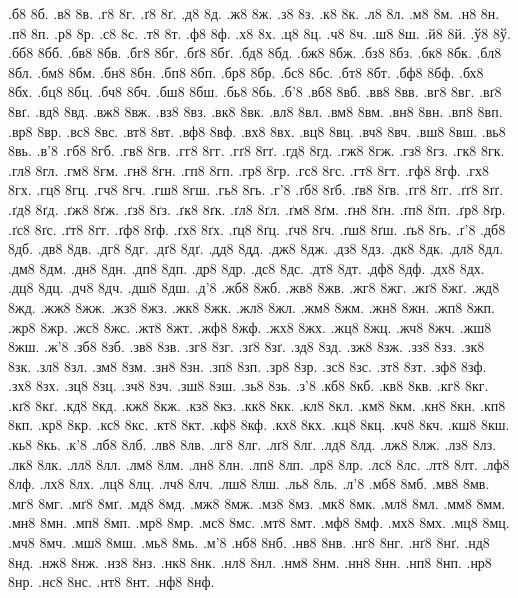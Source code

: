 {%
%
.б8 8б.
.в8 8в.
.г8 8г.
.ґ8 8ґ.
.д8 8д.
.ж8 8ж.
.з8 8з.
.к8 8к.
.л8 8л.
.м8 8м.
.н8 8н.
.п8 8п.
.р8 8р.
.с8 8с.
.т8 8т.
.ф8 8ф.
.х8 8х.
.ц8 8ц.
.ч8 8ч.
.ш8 8ш.
.й8 8й.
.ў8 8ў.
.бб8 8бб.
.бв8 8бв.
.бг8 8бг.
.бґ8 8бґ.
.бд8 8бд.
.бж8 8бж.
.бз8 8бз.
.бк8 8бк.
.бл8 8бл.
.бм8 8бм.
.бн8 8бн.
.бп8 8бп.
.бр8 8бр.
.бс8 8бс.
.бт8 8бт.
.бф8 8бф.
.бх8 8бх.
.бц8 8бц.
.бч8 8бч.
.бш8 8бш.
.бь8 8бь.
.б'8
.вб8 8вб.
.вв8 8вв.
.вг8 8вг.
.вґ8 8вґ.
.вд8 8вд.
.вж8 8вж.
.вз8 8вз.
.вк8 8вк.
.вл8 8вл.
.вм8 8вм.
.вн8 8вн.
.вп8 8вп.
.вр8 8вр.
.вс8 8вс.
.вт8 8вт.
.вф8 8вф.
.вх8 8вх.
.вц8 8вц.
.вч8 8вч.
.вш8 8вш.
.вь8 8вь.
.в'8
.гб8 8гб.
.гв8 8гв.
.гг8 8гг.
.гґ8 8гґ.
.гд8 8гд.
.гж8 8гж.
.гз8 8гз.
.гк8 8гк.
.гл8 8гл.
.гм8 8гм.
.гн8 8гн.
.гп8 8гп.
.гр8 8гр.
.гс8 8гс.
.гт8 8гт.
.гф8 8гф.
.гх8 8гх.
.гц8 8гц.
.гч8 8гч.
.гш8 8гш.
.гь8 8гь.
.г'8
.ґб8 8ґб.
.ґв8 8ґв.
.ґг8 8ґг.
.ґґ8 8ґґ.
.ґд8 8ґд.
.ґж8 8ґж.
.ґз8 8ґз.
.ґк8 8ґк.
.ґл8 8ґл.
.ґм8 8ґм.
.ґн8 8ґн.
.ґп8 8ґп.
.ґр8 8ґр.
.ґс8 8ґс.
.ґт8 8ґт.
.ґф8 8ґф.
.ґх8 8ґх.
.ґц8 8ґц.
.ґч8 8ґч.
.ґш8 8ґш.
.ґь8 8ґь.
.ґ'8
.дб8 8дб.
.дв8 8дв.
.дг8 8дг.
.дґ8 8дґ.
.дд8 8дд.
.дж8 8дж.
.дз8 8дз.
.дк8 8дк.
.дл8 8дл.
.дм8 8дм.
.дн8 8дн.
.дп8 8дп.
.др8 8др.
.дс8 8дс.
.дт8 8дт.
.дф8 8дф.
.дх8 8дх.
.дц8 8дц.
.дч8 8дч.
.дш8 8дш.
.д'8
.жб8 8жб.
.жв8 8жв.
.жг8 8жг.
.жґ8 8жґ.
.жд8 8жд.
.жж8 8жж.
.жз8 8жз.
.жк8 8жк.
.жл8 8жл.
.жм8 8жм.
.жн8 8жн.
.жп8 8жп.
.жр8 8жр.
.жс8 8жс.
.жт8 8жт.
.жф8 8жф.
.жх8 8жх.
.жц8 8жц.
.жч8 8жч.
.жш8 8жш.
.ж'8
.зб8 8зб.
.зв8 8зв.
.зг8 8зг.
.зґ8 8зґ.
.зд8 8зд.
.зж8 8зж.
.зз8 8зз.
.зк8 8зк.
.зл8 8зл.
.зм8 8зм.
.зн8 8зн.
.зп8 8зп.
.зр8 8зр.
.зс8 8зс.
.зт8 8зт.
.зф8 8зф.
.зх8 8зх.
.зц8 8зц.
.зч8 8зч.
.зш8 8зш.
.зь8 8зь.
.з'8
.кб8 8кб.
.кв8 8кв.
.кг8 8кг.
.кґ8 8кґ.
.кд8 8кд.
.кж8 8кж.
.кз8 8кз.
.кк8 8кк.
.кл8 8кл.
.км8 8км.
.кн8 8кн.
.кп8 8кп.
.кр8 8кр.
.кс8 8кс.
.кт8 8кт.
.кф8 8кф.
.кх8 8кх.
.кц8 8кц.
.кч8 8кч.
.кш8 8кш.
.кь8 8кь.
.к'8
.лб8 8лб.
.лв8 8лв.
.лг8 8лг.
.лґ8 8лґ.
.лд8 8лд.
.лж8 8лж.
.лз8 8лз.
.лк8 8лк.
.лл8 8лл.
.лм8 8лм.
.лн8 8лн.
.лп8 8лп.
.лр8 8лр.
.лс8 8лс.
.лт8 8лт.
.лф8 8лф.
.лх8 8лх.
.лц8 8лц.
.лч8 8лч.
.лш8 8лш.
.ль8 8ль.
.л'8
.мб8 8мб.
.мв8 8мв.
.мг8 8мг.
.мґ8 8мґ.
.мд8 8мд.
.мж8 8мж.
.мз8 8мз.
.мк8 8мк.
.мл8 8мл.
.мм8 8мм.
.мн8 8мн.
.мп8 8мп.
.мр8 8мр.
.мс8 8мс.
.мт8 8мт.
.мф8 8мф.
.мх8 8мх.
.мц8 8мц.
.мч8 8мч.
.мш8 8мш.
.мь8 8мь.
.м'8
.нб8 8нб.
.нв8 8нв.
.нг8 8нг.
.нґ8 8нґ.
.нд8 8нд.
.нж8 8нж.
.нз8 8нз.
.нк8 8нк.
.нл8 8нл.
.нм8 8нм.
.нн8 8нн.
.нп8 8нп.
.нр8 8нр.
.нс8 8нс.
.нт8 8нт.
.нф8 8нф.
}
